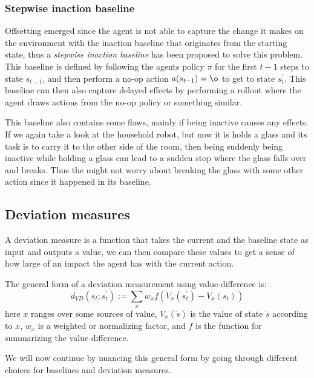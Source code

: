 \documentclass[12pt,A4]{report}
\theoremstyle{definition}
\begin{document}
\subsubsection{Stepwise inaction baseline}
Offsetting emerged since the agent is not able to capture the change it makes on the environment with the inaction baseline that originates from the starting state, thus a \textit{stepwise inaction baseline} has been proposed to solve this problem. This baseline is defined by following the agents policy $\pi$ for the first $t-1$ steps to state $s_{t-1}$, and then perform a no-op action $a(s_{t-1}) = \o$ to get to state $s^\prime_t$. This baseline can then also capture delayed effects by performing a rollout where the agent draws actions from the no-op policy or something similar.  

This baseline also contains some flaws, mainly if being inactive causes any effects. If we again take a look at the household robot, but now it is holds a glass and its task is to carry it to the other side of the room, then being suddenly being inactive while holding a glass can lead to a sudden stop where the glass falls over and breaks. Thus the might not worry about breaking the glass with some other action since it happened in its baseline. 

\subsection{Deviation measures}
A deviation measure is a function that takes the current and the baseline state as input and outputs a value, we can then compare these values to get a sense of how large of an impact the agent has with the current action.

The general form of a deviation measurement using value-difference is:
  \[d_{VD}(s_t;s^{\prime}_t) := \sum_x w_x f(V_x(s^{\prime}_t) - V_x(s_t))\]
here $x$ ranges over some sources of value, $V_x(\tilde{s})$ is the value of state $\tilde{s}$ according to $x$, $w_x$ is a weighted or normalizing factor, and $f$ is the function for summarizing the value difference.

We will now continue by nuancing this general form by going through different choices for baselines and deviation measures.
\end{document}
